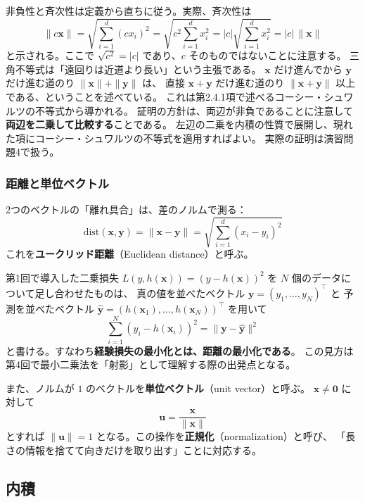 非負性と斉次性は定義から直ちに従う。実際、斉次性は
\begin{equation}
  \|c\bm{x}\| = \sqrt{\sum_{i=1}^{d} (c x_i)^2} = \sqrt{c^2 \sum_{i=1}^{d} x_i^2}
  = |c| \sqrt{\sum_{i=1}^{d} x_i^2} = |c| \, \|\bm{x}\|
\end{equation}
と示される。ここで $\sqrt{c^2} = |c|$ であり、$c$ そのものではないことに注意する。
三角不等式は「遠回りは近道より長い」という主張である。
$\bm{x}$ だけ進んでから $\bm{y}$ だけ進む道のり $\|\bm{x}\| + \|\bm{y}\|$ は、
直接 $\bm{x} + \bm{y}$ だけ進む道のり $\|\bm{x} + \bm{y}\|$ 以上である、ということを述べている。
これは第2.4.1項で述べるコーシー・シュワルツの不等式から導かれる。
証明の方針は、両辺が非負であることに注意して\textbf{両辺を二乗して比較する}ことである。
左辺の二乗を内積の性質で展開し、現れた項にコーシー・シュワルツの不等式を適用すればよい。
実際の証明は演習問題4で扱う。

\subsubsection{距離と単位ベクトル}

2つのベクトルの「離れ具合」は、差のノルムで測る：
\begin{equation}
  \mathrm{dist}(\bm{x}, \bm{y}) = \|\bm{x} - \bm{y}\|
  = \sqrt{\sum_{i=1}^{d} (x_i - y_i)^2}
\end{equation}
これを\textbf{ユークリッド距離}（Euclidean distance）と呼ぶ。

第1回で導入した二乗損失 $L(y, h(\bm{x})) = (y - h(\bm{x}))^2$ を
$N$ 個のデータについて足し合わせたものは、
真の値を並べたベクトル $\bm{y} = (y_1, \ldots, y_N)^\top$ と
予測を並べたベクトル $\hat{\bm{y}} = (h(\bm{x}_1), \ldots, h(\bm{x}_N))^\top$ を用いて
\begin{equation}
  \sum_{i=1}^{N} (y_i - h(\bm{x}_i))^2 = \|\bm{y} - \hat{\bm{y}}\|^2
\end{equation}
と書ける。すなわち\textbf{経験損失の最小化とは、距離の最小化である}。
この見方は第4回で最小二乗法を「射影」として理解する際の出発点となる。

また、ノルムが $1$ のベクトルを\textbf{単位ベクトル}（unit vector）と呼ぶ。
$\bm{x} \neq \bm{0}$ に対して
\begin{equation}
  \bm{u} = \frac{\bm{x}}{\|\bm{x}\|}
\end{equation}
とすれば $\|\bm{u}\| = 1$ となる。この操作を\textbf{正規化}（normalization）と呼び、
「長さの情報を捨てて向きだけを取り出す」ことに対応する。


\subsection{内積}

